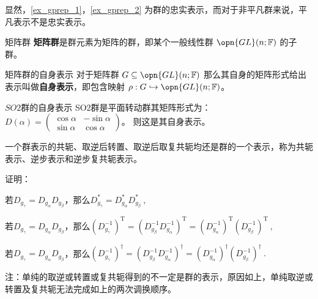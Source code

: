 显然，\autoref{ex_gprep_1}，\autoref{ex_gprep_2} 为群的忠实表示，而对于非平凡群来说，平凡表示不是忠实表示。

\begin{definition}{矩阵群}
\textbf{矩阵群}是群元素为矩阵的群，即某个一般线性群 $\opn{GL}(n; \mathbb{F})$ 的子群。
\end{definition}

\begin{definition}{矩阵群的自身表示}
对于矩阵群 $G \subseteq \opn{GL}(n; \mathbb{F})$ 那么其自身的矩阵形式给出表示叫做\textbf{自身表示}，即包含映射 $\rho: G \hookrightarrow \opn{GL}(n; \mathbb{F})$。
\end{definition}

\begin{example}{$SO2$群的自身表示}
SO2群是平面转动群其矩阵形式为：$D(\alpha)=\begin{pmatrix}
 \cos{\alpha} & -\sin{\alpha}\\
 \sin{\alpha} & \cos{\alpha}
\end{pmatrix}$。
则这是其自身表示。
\end{example}

\begin{corollary}{}
一个群表示的共轭、取逆后转置、取逆后取复共轭均还是群的一个表示，称为共轭表示、逆步表示和逆步复共轭表示。
\end{corollary}

证明：

若$D_{g_\gamma}=D_{g_\alpha}D_{g_\beta}$，那么$D_{g_\gamma}^*=D_{g_\alpha}^*D_{g_\beta}^*~,$

若$D_{g_\gamma}=D_{g_\alpha}D_{g_\beta}$，那么$(D_{g_\gamma}^{-1})^\mathrm{T}=(D_{g_\beta}^{-1}D_{g_\alpha}^{-1})^\mathrm{T}=(D_{g_\alpha}^{-1})^\mathrm{T}(D_{g_\beta}^{-1})^\mathrm{T}~,$

若$D_{g_\gamma}=D_{g_\alpha}D_{g_\beta}$，那么$(D_{g_\gamma}^{-1})^\dagger=(D_{g_\beta}^{-1}D_{g_\alpha}^{-1})^\dagger=(D_{g_\alpha}^{-1})^\dagger(D_{g_\beta}^{-1})^\dagger~.$

注：单纯的取逆或转置或复共轭得到的不一定是群的表示，原因如上，单纯取逆或转置及复共轭无法完成如上的两次调换顺序。